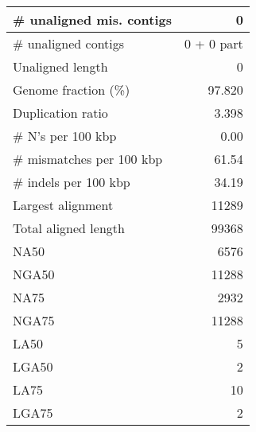 \documentclass[12pt,a4paper]{article}
\begin{document}
\begin{table}[ht]
\begin{center}
\begin{tabular}{|l*{1}{|r}|}
\# unaligned mis. contigs & 0 \\ \hline
\# unaligned contigs & 0 + 0 part \\ \hline
Unaligned length & 0 \\ \hline
Genome fraction (\%) & 97.820 \\ \hline
Duplication ratio & 3.398 \\ \hline
\# N's per 100 kbp & 0.00 \\ \hline
\# mismatches per 100 kbp & 61.54 \\ \hline
\# indels per 100 kbp & 34.19 \\ \hline
Largest alignment & 11289 \\ \hline
Total aligned length & 99368 \\ \hline
NA50 & 6576 \\ \hline
NGA50 & 11288 \\ \hline
NA75 & 2932 \\ \hline
NGA75 & 11288 \\ \hline
LA50 & 5 \\ \hline
LGA50 & 2 \\ \hline
LA75 & 10 \\ \hline
LGA75 & 2 \\ \hline
\end{tabular}
\end{center}
\end{table}
\end{document}
